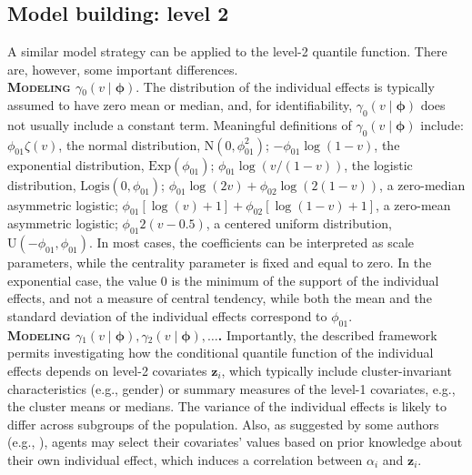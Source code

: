 \documentclass[12pt]{article}
\def\phivec{\bm{\phi}}
\def\zz{\bm{z}}
\begin{document}
\subsection{Model building: level 2}\label{subsec:level2}

A similar model strategy can be applied to the level-2 quantile function.
There are, however, some important differences.\vspace{0.3cm}\\ 
\textbf{\textsc{Modeling $\gamma_0(v \mid \phivec)$}}.
The distribution of the individual effects is typically assumed to have zero mean or median, and,
for identifiability, $\gamma_0(v \mid \phivec)$ does not usually include a constant term. Meaningful definitions
of $\gamma_0(v \mid \phivec)$ include:
$\phi_{01}\zeta(v)$, the normal distribution, $\text{N}(0, \phi_{01}^2)$;
$-\phi_{01}\log(1 - v)$, the exponential distribution, $\text{Exp}(\phi_{01})$;
$\phi_{01}\log(v/(1 - v))$, the logistic distribution, $\text{Logis}(0, \phi_{01})$;
$\phi_{01}\log(2v) + \phi_{02}\log(2(1 - v))$, a zero-median asymmetric logistic;
$\phi_{01}[\log(v) + 1] + \phi_{02}[\log(1 - v) + 1]$, a zero-mean asymmetric logistic;
$\phi_{01}2(v - 0.5)$, a centered uniform distribution, $\text{U}(-\phi_{01}, \phi_{01})$.
In most cases, the coefficients can be interpreted as scale parameters, while the centrality parameter is 
fixed and equal to zero. In the exponential case, the value $0$ is the minimum of the support of the individual effects, 
and not a measure of central tendency, while both 
the mean and the standard deviation of the individual effects correspond to $\phi_{01}$.\vspace{0.3cm}\\ 
\textbf{\textsc{Modeling $\gamma_1(v \mid \phivec), \gamma_2(v \mid \phivec), \ldots$.}} 
Importantly, the described framework permits investigating how the conditional quantile function of the individual effects
depends on level-2 covariates $\zz_i$, which typically include cluster-invariant characteristics (e.g., gender) or 
summary measures of the level-1 covariates, e.g., the cluster means or medians. 
The variance of the individual effects is likely to differ across subgroups of the population.
Also, as suggested by some authors (e.g., \citealp{lancaster}), agents may select their covariates' values based on prior knowledge about their own individual effect, 
which induces a correlation between $\alpha_i$ and $\zz_i$.
\end{document}
